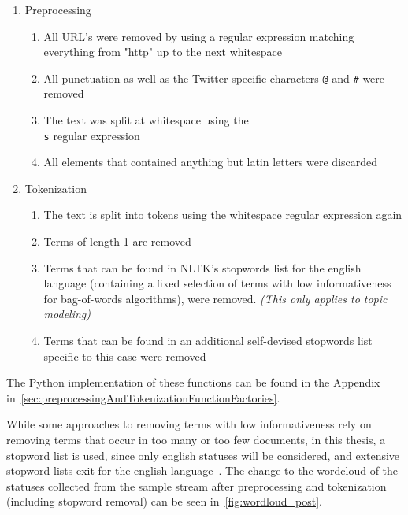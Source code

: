 \begin{enumerate}
    \item Preprocessing
    \begin{enumerate}
        \item All URL's were removed by using a regular expression matching everything from "http" up to the next whitespace
        \item All punctuation as well as the Twitter-specific characters \texttt{@} and \texttt{\#} were removed
        \item The text was split at whitespace using the \texttt{\\s} regular expression
        \item All elements that contained anything but latin letters were discarded
    \end{enumerate}
    \item Tokenization
    \begin{enumerate}
        \item The text is split into tokens using the whitespace regular expression again
        \item Terms of length 1 are removed
        \item Terms that can be found in NLTK's stopwords list for the english language
        (containing a fixed selection of terms with low informativeness for bag-of-words algorithms),
        were removed. \textit{(This only applies to topic modeling)}
        \item Terms that can be found in an additional self-devised stopwords list specific to this case were removed
    \end{enumerate}
\end{enumerate}

The Python implementation of these functions can be found in the Appendix in~\autoref{sec:preprocessingAndTokenizationFunctionFactories}.
\par
While some approaches to removing terms with low informativeness rely on removing terms that occur in too many or too few documents,
in this thesis, a stopword list is used,
since only english statuses will be considered, and extensive stopword lists exit for the english language~\cite{Porter2001}.
The change to the wordcloud of the statuses collected from the sample stream after preprocessing and tokenization (including stopword removal) can be seen in~\autoref{fig:wordloud_post}.

